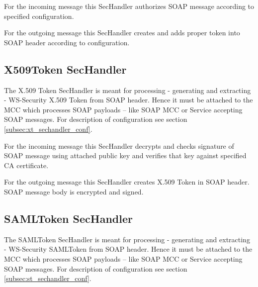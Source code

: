\documentclass{article}                            %
\begin{document}
For the incoming message this SecHandler authorizes SOAP message according to specified configuration.

For the outgoing message this SecHandler creates and adds proper token into SOAP header according to configuration.

\subsection{X509Token SecHandler} %
\label{subsec:x509_token}
The X.509 Token SecHandler is meant for processing - generating and extracting - WS-Security \cite{ws-security} X.509 Token from SOAP header. Hence it must be attached to the MCC which processes SOAP payloads – like SOAP MCC or Service accepting SOAP messages. For description of configuration see section \ref{subsec:xt_sechandler_conf}.

For the incoming message this SecHandler decrypts and checks signature of SOAP message using attached public key and verifies that key against specified CA certificate.

For the outgoing message this SecHandler creates X.509 Token in SOAP header. SOAP message body is encrypted and signed.

\subsection{SAMLToken SecHandler} %
\label{subsec:saml_token}
The SAMLToken SecHandler is meant for processing - generating and extracting - WS-Security \cite{ws-security} SAMLToken from SOAP header. Hence it must be attached to the MCC which processes SOAP payloads – like SOAP MCC or Service accepting SOAP messages. For description of configuration see section \ref{subsec:st_sechandler_conf}.

\begin{figure}
\end{figure}
\end{document}
